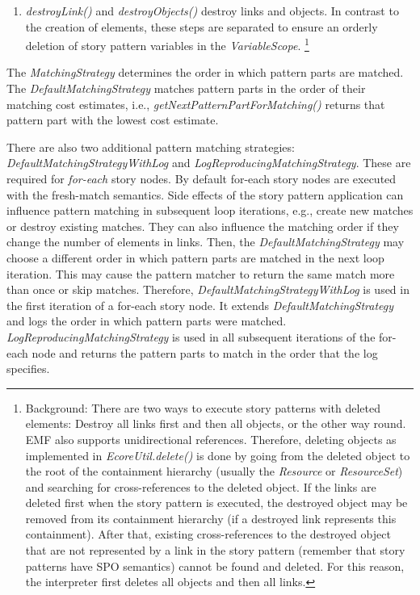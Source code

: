 \begin{enumerate}
	\item \emph{destroyLink()} and \emph{destroyObjects()} destroy links and objects. 
	In contrast to the creation of elements, these steps are separated to ensure an orderly deletion of story pattern variables in the \emph{VariableScope}.
	\footnote{Background: There are two ways to execute story patterns with deleted elements: Destroy all links first and then all objects, or the other way round. 
	EMF also supports unidirectional references. 
	Therefore, deleting objects as implemented in \emph{EcoreUtil.delete()} is done by going from the deleted object to the root of the containment hierarchy (usually the \emph{Resource} or \emph{ResourceSet}) and searching for cross-references to the deleted object. 
	If the links are deleted first when the story pattern is executed, the destroyed object may be removed from its containment hierarchy (if a destroyed link represents this containment). 
	After that, existing cross-references to the destroyed object that are not represented by a link in the story pattern (remember that story patterns have SPO semantics) cannot be found and deleted. 
	For this reason, the interpreter first deletes all objects and then all links.}
	

\end{enumerate}


The \emph{MatchingStrategy} determines the order in which pattern parts are matched. 
The \emph{DefaultMatchingStrategy} matches pattern parts in the order of their matching cost estimates, i.e., \emph{getNextPatternPartForMatching()} returns that pattern part with the lowest cost estimate. 

There are also two additional pattern matching strategies: \emph{DefaultMatchingStrategyWithLog} and \emph{LogReproducingMatchingStrategy}. 
These are required for \emph{for-each} story nodes. 
By default for-each story nodes are executed with the fresh-match semantics. 
Side effects of the story pattern application can influence pattern matching in subsequent loop iterations, e.g., create new matches or destroy existing matches. 
They can also influence the matching order if they change the number of elements in links. 
Then, the \emph{DefaultMatchingStrategy} may choose a different order in which pattern parts are matched in the next loop iteration. 
This may cause the pattern matcher to return the same match more than once or skip matches. 
Therefore, \emph{DefaultMatchingStrategyWithLog} is used in the first iteration of a for-each story node. 
It extends \emph{DefaultMatchingStrategy} and logs the order in which pattern parts were matched. 
\emph{LogReproducingMatchingStrategy} is used in all subsequent iterations of the for-each node and returns the pattern parts to match in the order that the log specifies.


